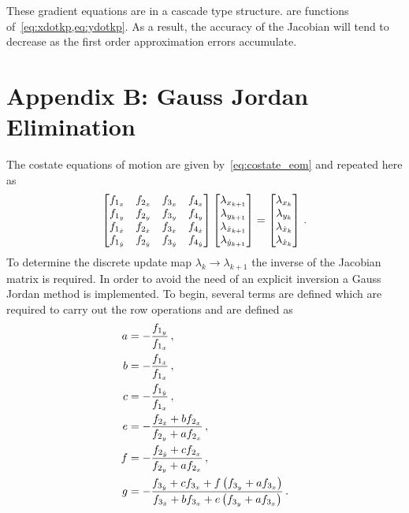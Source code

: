 \documentclass[letterpaper, paper,11pt]{AAS}		%
\begin{document}
These gradient equations are in a cascade type structure.
 are functions of~\cref{eq:xdotkp,eq:ydotkp}.
As a result, the accuracy of the Jacobian will tend to decrease as the first order approximation errors accumulate.

\section*{Appendix B: Gauss Jordan Elimination}\label{sec:costate_gauss_jordan}
The costate equations of motion are given by~\cref{eq:costate_eom} and repeated here as
\begin{align}\label{eq:costate_eom_transpose}
	\begin{bmatrix} 
		\fonex & \ftwox & \fthreex & \ffourx \\
		\foney & \ftwoy & \fthreey & \ffoury \\
		\fonexd & \ftwoxd & \fthreexd & \ffourxd \\
		\foneyd & \ftwoyd & \fthreeyd & \ffouryd
	\end{bmatrix}
	\begin{bmatrix} \lambda_{\xkp} \\ \lambda_{\ykp} \\ \lambda_{\xdotkp} \\ \lambda_{\ydotkp} \end{bmatrix}
	=
	\begin{bmatrix} \lambda_{\xk} \\ \lambda_{\yk} \\ \lambda_{\xdotk} \\ \lambda_{\ydotk} \end{bmatrix} \, .
\end{align}
To determine the discrete update map \( \lambda_k \to \lambda_{k+1}\) the inverse of the Jacobian matrix is required.
In order to avoid the need of an explicit inversion a Gauss Jordan method is implemented.
To begin, several terms are defined which are required to carry out the row operations and are defined as
\begin{subequations}\label{eq:ref_scale}
\begin{align}
	a &= -\frac{f_{1_y}}{f_{1_x}} \, ,\\
	b &= -\frac{f_{1_{\dot x}}}{f_{1_x}} \, , \\
	c &= -\frac{f_{1_{\dot y}}}{f_{1_x}} \, ,\\
	e &= -\frac{f_{2_{\dot x}} + b f_{2_x}}{f_{2_y} + a f_{2_x}} \, ,\\
	f &= -\frac{f_{2_{\dot y}} + c f_{2_x}}{f_{2_y} + a f_{2_x}} \, ,\\
	g &= -\frac{f_{3_{\dot y}} + c f_{3_x} + f \left( f_{3_y} + a f_{3_x} \right)}{f_{3_{\dot x}} + b f_{3_x} + e \left( f_{3_y} + a f_{3_x} \right)}\, .
\end{align}
\end{subequations}
\end{document}
